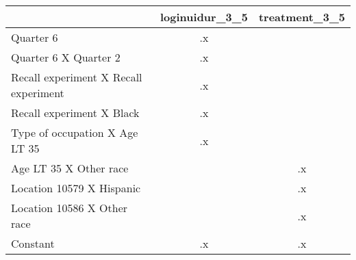 \begin{tabular}{l*{2}{c}}
\hline\hline
                    &loginuidur\_3\_5&treatment\_3\_5\\
\hline
Quarter 6           &          .x&            \\
Quarter 6 X Quarter 2&          .x&            \\
Recall experiment X Recall experiment&          .x&            \\
Recall experiment X Black&          .x&            \\
Type of occupation X Age LT 35&          .x&            \\
Age LT 35 X Other race&            &          .x\\
Location 10579 X Hispanic&            &          .x\\
Location 10586 X Other race&            &          .x\\
Constant            &          .x&          .x\\
\hline\hline
\end{tabular}
